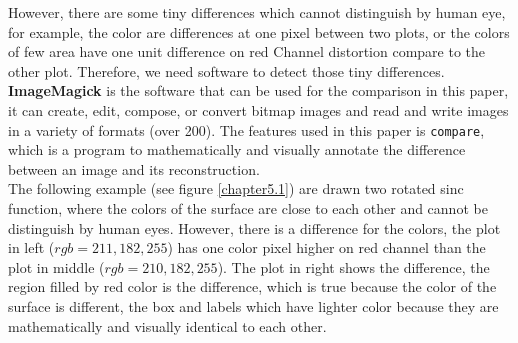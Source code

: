 \documentclass[paper=a4, fontsize=11pt]{report}
\begin{document}
However, there are some tiny differences which cannot distinguish by human eye, for example, the color are differences at one pixel between two plots, or the colors of few area have one unit difference on red Channel distortion compare to the other plot. Therefore, we need software to detect those tiny differences.\\

\textbf{ImageMagick} is the software that can be used for the comparison in this paper, it can create, edit, compose, or convert bitmap images and read and write images in a variety of formats (over 200). The features used in this paper is \texttt{compare}, which is a program to mathematically and visually annotate the difference between an image and its reconstruction.\\

The following example (see figure \ref{chapter5.1}) are drawn two rotated sinc function, where the colors of the surface are close to each other and cannot be distinguish by human eyes. However, there is a difference for the colors, the plot in left ($rgb = 211, 182, 255$) has one color pixel higher on red channel than the plot in middle ($rgb = 210, 182, 255$). The plot in right shows the difference, the region filled by red color is the difference, which is true because the color of the surface is different, the box and labels which have lighter color because they are mathematically and visually identical to each other. \\
\end{document}
